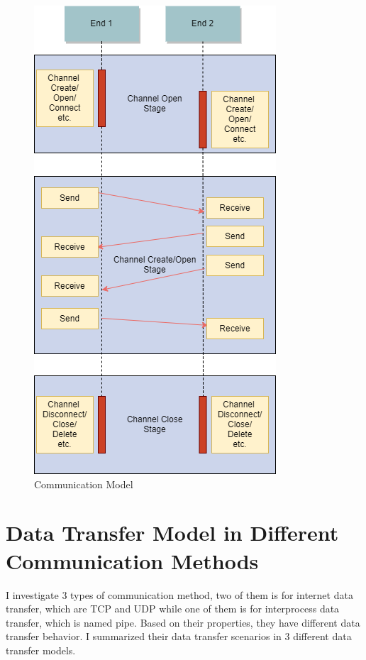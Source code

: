 \begin{figure}[h]
\centerline{\includegraphics[scale=0.6]{Figures/communicationhappen}}
 \caption{Communication Model}
\label{communicationhappen}
\end{figure}


\section{Data Transfer Model in Different Communication Methods}
I investigate 3 types of communication method, two of them is for internet data transfer, which are TCP and UDP while one of them is for interprocess data transfer, which is named pipe. Based on their properties, they have different data transfer behavior. I summarized their data transfer scenarios in 3 different data transfer models.

